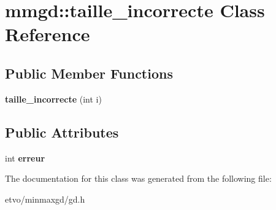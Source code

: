 \hypertarget{classmmgd_1_1taille__incorrecte}{}\section{mmgd\+:\+:taille\+\_\+incorrecte Class Reference}
\label{classmmgd_1_1taille__incorrecte}
\subsection*{Public Member Functions}
\begin{DoxyCompactItemize}
\item 
\mbox{\label{classmmgd_1_1taille__incorrecte_a386ba698f1fbf5c24a7d5dae2bd82cf9}} 
{\bfseries taille\+\_\+incorrecte} (int i)
\end{DoxyCompactItemize}
\subsection*{Public Attributes}
\begin{DoxyCompactItemize}
\item 
\mbox{\label{classmmgd_1_1taille__incorrecte_a7e7428f326edd8e504a84cd90ff931eb}} 
int {\bfseries erreur}
\end{DoxyCompactItemize}


The documentation for this class was generated from the following file\+:\begin{DoxyCompactItemize}
\item 
etvo/minmaxgd/gd.\+h\end{DoxyCompactItemize}

